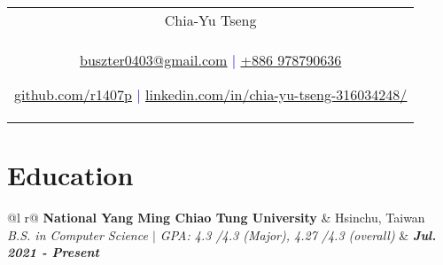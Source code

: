 \documentclass[a4paper,8pt]{article}
\begin{document}
\pagestyle{empty} 


\begin{tabularx}{\linewidth}{@{} C @{}}
\color[HTML]{1C033C} \Huge{Chia-Yu Tseng} \\
\textcolor[HTML]{0000cd}{\underline{\href{mailto:buszter0403@gmail.com
}{\raisebox{-0.05\height}{\faEnvelope} buszter0403@gmail.com}} $|$}
\textcolor[HTML]{0000cd}{\href{tel:+525513219900}{\raisebox{-0.05\height}{\faMobile} +886 978790636}}

\textcolor[HTML]{0000cd}{\underline{\href{https://github.com/r1407p}{\raisebox{-0.05\height}{\faGithub} github.com/r1407p}} $|$}
\textcolor[HTML]{0000cd}{\underline{\href{https://www.linkedin.com/in/chia-yu-tseng-316034248/}{\raisebox{-0.05\height}{\faLinkedin} linkedin.com/in/chia-yu-tseng-316034248/}}}
\end{tabularx}
\section{Education}
\begin{tabularx}{\linewidth}{ @{}l r@{} }
\color[HTML]{1C033C} \textbf{National Yang Ming Chiao Tung University} & \hfill \color[HTML]{371e77} Hsinchu, Taiwan \\
\color[HTML]{371e77} \textit{B.S. in Computer Science  $|$ GPA: 4.3 /4.3 (Major), 4.27 /4.3 (overall)} & \hfill \color[HTML]{4B28A4} \textit{\textbf{Jul. 2021 - Present }} \\
\end{tabularx}
\end{document}
